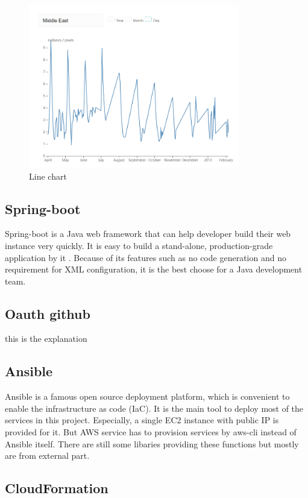 \documentclass[conference]{IEEEtran}
\begin{document}
\begin{figure}[htbp]
    \centerline{\includegraphics[width=260pt]{images/Line_chart.png}}
    \caption{Line chart}
    \label{lchart}
\end{figure}

\subsection{Spring-boot}

Spring-boot is a Java web framework that can help developer build their web instance very quickly. It is easy to build a 
stand-alone, production-grade application by it \cite{SpringBo66:online}. Because of its features such as no code generation 
and no requirement for XML configuration, it is the best choose for a Java development team.

\subsection{Oauth github}

this is the explanation

\subsection{Ansible}

Ansible is a famous open source deployment platform, which is convenient to enable the infrastructure as code (IaC). 
It is the main tool to deploy most of the services in this project. Especially, a single EC2 instance with public 
IP is provided for it. But AWS service has to provision services by aws-cli instead of Ansible itself. There are still 
some libaries providing these functions but mostly are from external part.

\subsection{CloudFormation}
\end{document}
